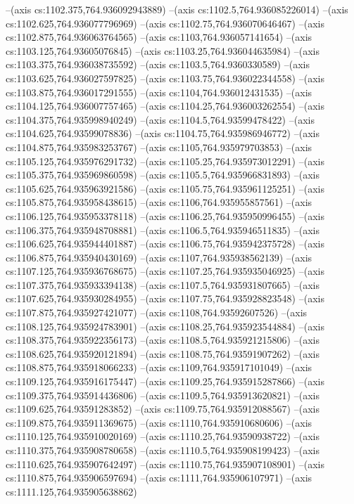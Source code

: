 --(axis cs:1102.375,764.936092943889)
--(axis cs:1102.5,764.936085226014)
--(axis cs:1102.625,764.936077796969)
--(axis cs:1102.75,764.936070646467)
--(axis cs:1102.875,764.936063764565)
--(axis cs:1103,764.936057141654)
--(axis cs:1103.125,764.93605076845)
--(axis cs:1103.25,764.936044635984)
--(axis cs:1103.375,764.936038735592)
--(axis cs:1103.5,764.9360330589)
--(axis cs:1103.625,764.936027597825)
--(axis cs:1103.75,764.936022344558)
--(axis cs:1103.875,764.936017291555)
--(axis cs:1104,764.936012431535)
--(axis cs:1104.125,764.936007757465)
--(axis cs:1104.25,764.936003262554)
--(axis cs:1104.375,764.935998940249)
--(axis cs:1104.5,764.93599478422)
--(axis cs:1104.625,764.93599078836)
--(axis cs:1104.75,764.935986946772)
--(axis cs:1104.875,764.935983253767)
--(axis cs:1105,764.935979703853)
--(axis cs:1105.125,764.935976291732)
--(axis cs:1105.25,764.935973012291)
--(axis cs:1105.375,764.935969860598)
--(axis cs:1105.5,764.935966831893)
--(axis cs:1105.625,764.935963921586)
--(axis cs:1105.75,764.935961125251)
--(axis cs:1105.875,764.935958438615)
--(axis cs:1106,764.935955857561)
--(axis cs:1106.125,764.935953378118)
--(axis cs:1106.25,764.935950996455)
--(axis cs:1106.375,764.935948708881)
--(axis cs:1106.5,764.935946511835)
--(axis cs:1106.625,764.935944401887)
--(axis cs:1106.75,764.935942375728)
--(axis cs:1106.875,764.935940430169)
--(axis cs:1107,764.935938562139)
--(axis cs:1107.125,764.935936768675)
--(axis cs:1107.25,764.935935046925)
--(axis cs:1107.375,764.935933394138)
--(axis cs:1107.5,764.935931807665)
--(axis cs:1107.625,764.935930284955)
--(axis cs:1107.75,764.935928823548)
--(axis cs:1107.875,764.935927421077)
--(axis cs:1108,764.93592607526)
--(axis cs:1108.125,764.935924783901)
--(axis cs:1108.25,764.935923544884)
--(axis cs:1108.375,764.935922356173)
--(axis cs:1108.5,764.935921215806)
--(axis cs:1108.625,764.935920121894)
--(axis cs:1108.75,764.93591907262)
--(axis cs:1108.875,764.935918066233)
--(axis cs:1109,764.935917101049)
--(axis cs:1109.125,764.935916175447)
--(axis cs:1109.25,764.935915287866)
--(axis cs:1109.375,764.935914436806)
--(axis cs:1109.5,764.935913620821)
--(axis cs:1109.625,764.93591283852)
--(axis cs:1109.75,764.935912088567)
--(axis cs:1109.875,764.935911369675)
--(axis cs:1110,764.935910680606)
--(axis cs:1110.125,764.935910020169)
--(axis cs:1110.25,764.93590938722)
--(axis cs:1110.375,764.935908780658)
--(axis cs:1110.5,764.935908199423)
--(axis cs:1110.625,764.935907642497)
--(axis cs:1110.75,764.935907108901)
--(axis cs:1110.875,764.935906597694)
--(axis cs:1111,764.935906107971)
--(axis cs:1111.125,764.935905638862)
